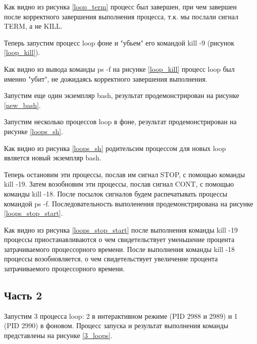 Как видно из рисунка \ref{loop_term} процесс был завершен, при чем завершен после корректного завершения выполнения процесса, т.к. мы послали сигнал TERM, а не KILL.

Теперь запустим процесс loop фоне и "убьем" его командой kill -9 (рисунок \ref{loop_kill}).


Как видно из вывода команды ps -f на рисунке \ref{loop_kill} процесс loop был именно "убит", не дожидаясь корректного завершения выполнения.

Запустим еще один экземпляр bash, результат продемонстрирован на рисунке \ref{new_bash}.


Запустим несколько процессов loop в фоне, результат продемонстрирован на рисунке \ref{loops_sh}.


Как видно из рисунка \ref{loops_sh} родительсим процессом для новых loop является новый экземпляр bash.

 Теперь остановим эти процессы, послав им сигнал STOP, с помощью команды kill -19. Затем возобновим эти процессы, послав сигнал CONT, с помощью команды kill -18. После посылок сигналов будем распечатывать процессы командой ps -f. Последовательность выполенения продемонстрирована на рисунке \ref{loops_stop_start}.


 Как видно из рисунка \ref{loops_stop_start} после выполнения команды kill -19 процессы приостанавливаются о чем свидетельствует уменьшение процента затрачиваемого процессорного времени. После выполнения команды kill -18 процессы возобновляется, о чем свидетельствует увеличение процента затрачиваемого процессорного времени.

 \subsection{Часть 2}

 Запустим 3 процесса loop: 2 в интерактивном режиме (PID 2988 и 2989) и 1 (PID 2990) в фоновом. Процесс запуска и результат выполнения команды представлены на рисунке \ref{3_loops}.


